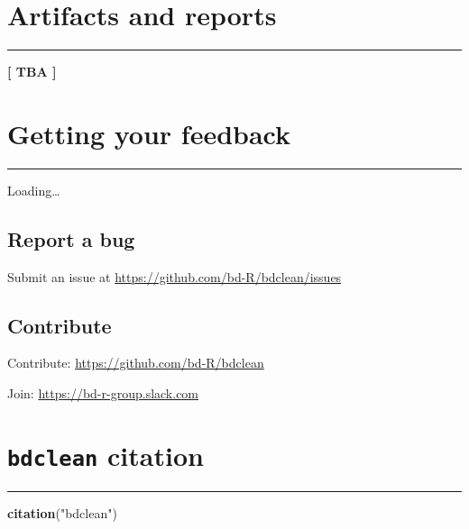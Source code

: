 \documentclass[]{book}
\newenvironment{Shaded}{\begin{snugshade}}{\end{snugshade}}
\newcommand{\KeywordTok}[1]{\textcolor[rgb]{0.13,0.29,0.53}{\textbf{#1}}}
\newcommand{\StringTok}[1]{\textcolor[rgb]{0.31,0.60,0.02}{#1}}
\newcommand{\NormalTok}[1]{#1}
\begin{document}
\chapter{Artifacts and reports}\label{artifacts-and-reports}

\begin{center}\rule{0.5\linewidth}{\linethickness}\end{center}

\textbf{{{[} TBA {]}}}

\chapter{Getting your feedback}\label{getting-your-feedback}

\begin{center}\rule{0.5\linewidth}{\linethickness}\end{center}

Loading\ldots{}

\section{Report a bug}\label{report-a-bug}

Submit an issue at \url{https://github.com/bd-R/bdclean/issues}

\section{Contribute}\label{contribute}

Contribute: \url{https://github.com/bd-R/bdclean}

Join: \url{https://bd-r-group.slack.com}

\chapter{\texorpdfstring{\texttt{bdclean}
citation}{bdclean citation}}\label{bdclean-citation}

\begin{center}\rule{0.5\linewidth}{\linethickness}\end{center}

\begin{Shaded}
\begin{Highlighting}[]
\KeywordTok{citation}\NormalTok{(}\StringTok{"bdclean"}\NormalTok{)}
\end{Highlighting}
\end{Shaded}
\end{document}
